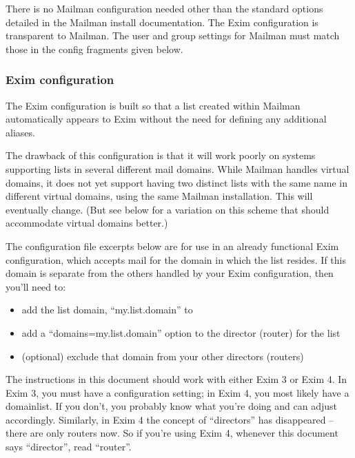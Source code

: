 \documentclass{howto}
\begin{document}
There is no Mailman configuration needed other than the standard options
detailed in the Mailman install documentation.  The Exim configuration is
transparent to Mailman.  The user and group settings for Mailman must match
those in the config fragments given below.

\subsubsection{Exim configuration}

The Exim configuration is built so that a list created within Mailman
automatically appears to Exim without the need for defining any additional
aliases.

The drawback of this configuration is that it will work poorly on systems
supporting lists in several different mail domains.  While Mailman handles
virtual domains, it does not yet support having two distinct lists with the
same name in different virtual domains, using the same Mailman installation.
This will eventually change.  (But see below for a variation on this scheme
that should accommodate virtual domains better.)

The configuration file excerpts below are for use in an already functional
Exim configuration, which accepts mail for the domain in which the list
resides.  If this domain is separate from the others handled by your Exim
configuration, then you'll need to:

\begin{itemize}
\item add the list domain, ``my.list.domain'' to 

\item add a ``domains=my.list.domain'' option to the director (router) for the
      list

\item (optional) exclude that domain from your other directors (routers)
\end{itemize}

\begin{notice}[note]
The instructions in this document should work with either Exim 3 or Exim 4.
In Exim 3, you must have a  configuration setting; in Exim
4, you most likely have a  domainlist.  If you don't, you
probably know what you're doing and can adjust accordingly.  Similarly, in
Exim 4 the concept of ``directors'' has disappeared -- there are only routers
now.  So if you're using Exim 4, whenever this document says ``director'',
read ``router''.
\end{notice}
\end{document}
